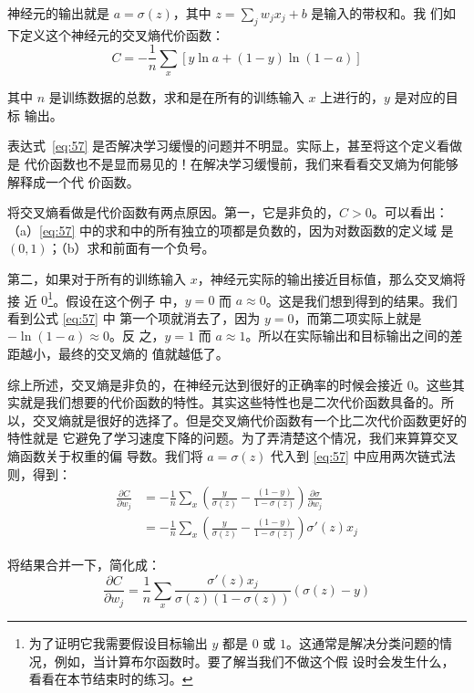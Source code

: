 神经元的输出就是 $a = \sigma(z)$，其中 $z = \sum_j w_j x_j+b$ 是输入的带权和。我
们如下定义这个神经元的交叉熵代价函数：
\begin{equation} 
  C = -\frac{1}{n} \sum_x \left[y \ln a + (1-y ) \ln (1-a) \right]
\label{eq:57}\tag{57}
\end{equation}

其中 $n$ 是训练数据的总数，求和是在所有的训练输入 $x$ 上进行的，$y$ 是对应的目标
输出。

表达式~\eqref{eq:57} 是否解决学习缓慢的问题并不明显。实际上，甚至将这个定义看做是
代价函数也不是显而易见的！在解决学习缓慢前，我们来看看交叉熵为何能够解释成一个代
价函数。

将交叉熵看做是代价函数有两点原因。第一，它是非负的，$C > 0$。可以看出：
（a）\eqref{eq:57} 中的求和中的所有独立的项都是负数的，因为对数函数的定义域
是 $(0,1)$；（b）求和前面有一个负号。

第二，如果对于所有的训练输入 $x$，神经元实际的输出接近目标值，那么交叉熵将接
近 $0$\footnote{为了证明它我需要假设目标输出 $y$ 都是 $0$ 或
  $1$。这通常是解决分类问题的情况，例如，当计算布尔函数时。要了解当我们不做这个假
  设时会发生什么，看看在本节结束时的练习。}。假设在这个例子
中，$y=0$ 而 $a\approx 0$。这是我们想到得到的结果。我们看到公式 \eqref{eq:57} 中
第一个项就消去了，因为 $y=0$，而第二项实际上就是 $-\ln (1-a)\approx 0$。反
之，$y=1$ 而 $a\approx 1$。所以在实际输出和目标输出之间的差距越小，最终的交叉熵的
值就越低了。

综上所述，交叉熵是非负的，在神经元达到很好的正确率的时候会接近
$0$。这些其实就是我们想要的代价函数的特性。其实这些特性也是二次代价函数具备的。所
以，交叉熵就是很好的选择了。但是交叉熵代价函数有一个比二次代价函数更好的特性就是
它避免了学习速度下降的问题。为了弄清楚这个情况，我们来算算交叉熵函数关于权重的偏
导数。我们将 $a=\sigma(z)$ 代入到 \eqref{eq:57} 中应用两次链式法则，得到：
\begin{align}
  \frac{\partial C}{\partial w_j} &= -\frac{1}{n} \sum_x \left(
                                    \frac{y }{\sigma(z)} -\frac{(1-y)}{1-\sigma(z)} \right)
                                    \frac{\partial \sigma}{\partial w_j} \label{eq:58}\tag{58}\\
                                  &= -\frac{1}{n} \sum_x \left( 
                                    \frac{y}{\sigma(z)} 
                                    -\frac{(1-y)}{1-\sigma(z)} \right)\sigma'(z) x_j \label{eq:59}\tag{59}
\end{align}

将结果合并一下，简化成：
\begin{equation}
  \frac{\partial C}{\partial w_j} = \frac{1}{n}
  \sum_x \frac{\sigma'(z) x_j}{\sigma(z) (1-\sigma(z))}
  (\sigma(z)-y)
\label{eq:60}\tag{60}
\end{equation}

